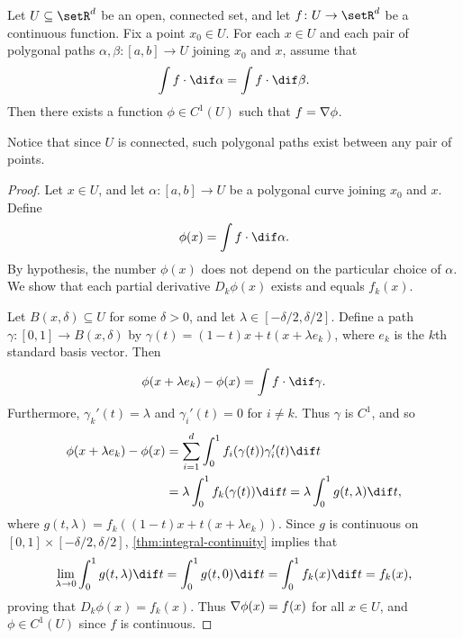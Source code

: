 \documentclass[article, a4paper, 11pt, oneside]{memoir}
\numberwithin{equation}{chapter}
\begin{document}
\begin{theorem}
	Let $U \subseteq \setR^d$ be an open, connected set, and let $f \colon U \to \setR^d$ be a continuous function. Fix a point $x_0 \in U$. For each $x \in U$ and each pair of polygonal paths $\alpha, \beta \colon [a,b] \to U$ joining $x_0$ and $x$, assume that
	\begin{equation*}
		\int f \cdot \dif\alpha
			= \int f \cdot \dif\beta.
	\end{equation*}
	Then there exists a function $\phi \in C^1(U)$ such that $f = \nabla\phi$.
\end{theorem}
%
Notice that since $U$ is connected, such polygonal paths exist between any pair of points.

\begin{proof}
	Let $x \in U$, and let $\alpha \colon [a,b] \to U$ be a polygonal curve joining $x_0$ and $x$. Define
	\begin{equation*}
		\phi(x) = \int f \cdot \dif\alpha.
	\end{equation*}
	By hypothesis, the number $\phi(x)$ does not depend on the particular choice of $\alpha$. We show that each partial derivative $D_k \phi(x)$ exists and equals $f_k(x)$.

	Let $B(x,\delta) \subseteq U$ for some $\delta > 0$, and let $\lambda \in [-\delta/2, \delta/2]$. Define a path $\gamma \colon [0,1] \to B(x,\delta)$ by $\gamma(t) = (1-t)x + t(x + \lambda e_k)$, where $e_k$ is the $k$th standard basis vector. Then
	\begin{equation*}
		\phi(x + \lambda e_k) - \phi(x)
			= \int f \cdot \dif\gamma.
	\end{equation*}
	Furthermore, $\gamma_k'(t) = \lambda$ and $\gamma_i'(t) = 0$ for $i \neq k$. Thus $\gamma$ is $C^1$, and so
	\begin{align*}
		\phi(x + \lambda e_k) - \phi(x)
			&= \sum_{i=1}^d \int_0^1 f_i(\gamma(t)) \gamma_i'(t) \dif t \\
			&= \lambda \int_0^1 f_k(\gamma(t)) \dif t
			 = \lambda \int_0^1 g(t,\lambda) \dif t,
	\end{align*}
	where $g(t,\lambda) = f_k((1-t)x + t(x + \lambda e_k))$. Since $g$ is continuous on $[0,1] \times [-\delta/2, \delta/2]$, \cref{thm:integral-continuity} implies that
	\begin{equation*}
		\lim_{\lambda \to 0} \int_0^1 g(t,\lambda) \dif t
			= \int_0^1 g(t,0) \dif t
			= \int_0^1 f_k(x) \dif t
			= f_k(x),
	\end{equation*}
	proving that $D_k \phi(x) = f_k(x)$. Thus $\nabla\phi(x) = f(x)$ for all $x \in U$, and $\phi \in C^1(U)$ since $f$ is continuous.
\end{proof}
\end{document}
